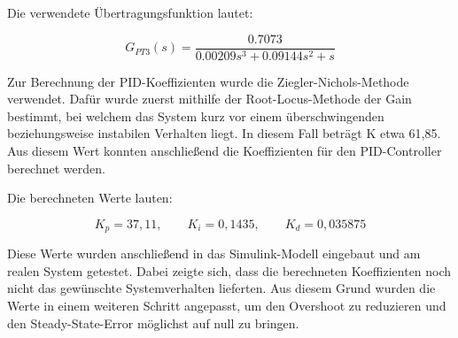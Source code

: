 Die verwendete Übertragungsfunktion lautet:

\begin{equation}
    G_{PT3}(s)=\frac{0.7073}{0.00209s^3+0.09144s^2+s}
\end{equation}
\vspace{0.2cm}

Zur Berechnung der PID-Koeffizienten wurde die Ziegler-Nichols-Methode verwendet. Dafür wurde zuerst mithilfe der Root-Locus-Methode der Gain bestimmt, bei welchem das System kurz vor einem überschwingenden beziehungsweise instabilen Verhalten liegt. In diesem Fall beträgt K etwa 61,85. Aus diesem Wert konnten anschließend die Koeffizienten für den PID-Controller berechnet werden.

\vspace{0.3cm}

Die berechneten Werte lauten:

\begin{equation}
    K_p = 37,11, \qquad K_i = 0,1435, \qquad K_d = 0,035875
\end{equation}
\vspace{0.2cm}

Diese Werte wurden anschließend in das Simulink-Modell eingebaut und am realen System getestet. Dabei zeigte sich, dass die berechneten Koeffizienten noch nicht das gewünschte Systemverhalten lieferten. Aus diesem Grund wurden die Werte in einem weiteren Schritt angepasst, um den Overshoot zu reduzieren und den Steady-State-Error möglichst auf null zu bringen.